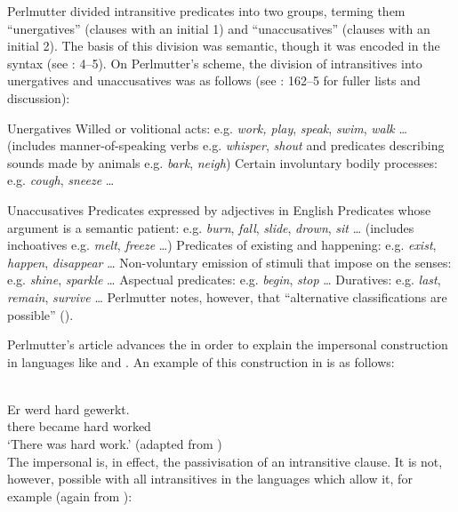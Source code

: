\documentclass[output=paper]{langsci/langscibook}
\begin{document}
Perlmutter divided intransitive predicates into two groups, terming them
\enquote{unergatives} (clauses with an initial 1) and \enquote{unaccusatives}
(clauses with an initial 2). The basis of this division was semantic, though it
was encoded in the syntax (see \citealt{LevinRappaportHovav1995}: 4–5). On
Perlmutter’s scheme, the division of intransitives into unergatives and
unaccusatives was as follows (see \citealt{Perlmutter1978}: 162–5 for fuller
lists and discussion):

\ea\label{ex:19.19} Unergatives
    \ea Willed or volitional acts: e.g. \emph{work, play}, \emph{speak}, \emph{swim}, \emph{walk} \dots{} (includes manner-of-speaking verbs e.g. \emph{whisper}, \emph{shout} and predicates describing sounds made by animals e.g. \emph{bark}, \emph{neigh})
    \ex Certain involuntary bodily processes: e.g. \emph{cough}, \emph{sneeze} \dots{}
    \z
\z

\ea\label{ex:19.20} Unaccusatives
    \ea Predicates expressed by adjectives in English
    \ex Predicates whose argument is a semantic patient: e.g. \emph{burn}, \emph{fall}, \emph{slide}, \emph{drown}, \emph{sit} \dots{} (includes inchoatives e.g. \emph{melt}, \emph{freeze} \dots{})
    \ex Predicates of existing and happening: e.g. \emph{exist}, \emph{happen}, \emph{disappear} \dots{}
    \ex Non-voluntary emission of stimuli that impose on the senses: e.g. \emph{shine}, \emph{sparkle} \dots{}
    \ex Aspectual predicates: e.g. \emph{begin}, \emph{stop} \dots{}
    \ex Duratives: e.g. \emph{last}, \emph{remain}, \emph{survive}
    \dots{}\hfill\parencite[162--163]{Perlmutter1978}
    \z
\z
Perlmutter notes, however, that \enquote{alternative classifications are
possible} (\citeyear[163]{Perlmutter1978}).

Perlmutter’s article advances the  in order to explain
the impersonal  construction in languages like  and
. An
example of this construction in  is as follows:

\ea {}\\
    \gll    Er   werd   hard   gewerkt.\\
            there   became   hard   worked\\
    \glt    \enquote*{There was hard work.} (adapted from \citealt[131]{Zaenen1993})\\
\z
The impersonal  is, in effect, the passivisation of an intransitive
clause. It is not, however, possible with all intransitives in the languages
which allow it, for example (again from ):
\end{document}
